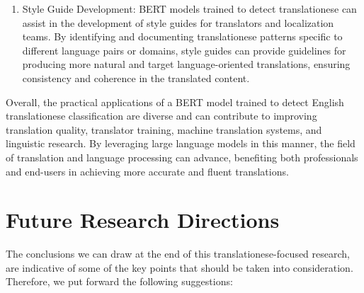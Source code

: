 \begin{enumerate}
    \item Style Guide Development: BERT models trained to detect translationese can assist in the development of style guides for translators and localization teams. By identifying and documenting translationese patterns specific to different language pairs or domains, style guides can provide guidelines for producing more natural and target language-oriented translations, ensuring consistency and coherence in the translated content.

\end{enumerate}

Overall, the practical applications of a BERT model trained to detect English translationese classification are diverse and can contribute to improving translation quality, translator training, machine translation systems, and linguistic research. By leveraging large language models in this manner, the field of translation and language processing can advance, benefiting both professionals and end-users in achieving more accurate and fluent translations.


\section{Future Research Directions}

The conclusions we can draw at the end of this translationese-focused research, are indicative of some of the key points that should be taken into consideration. Therefore, we put forward the following suggestions:

